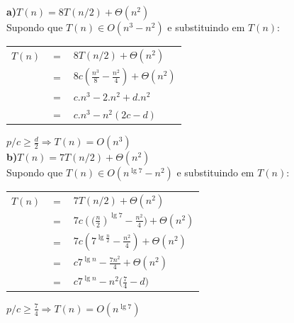 \documentclass[a4paper]{exam}
\begin{document}
\begin{questions}
  \begin{solution}
    \textbf{a)$T(n) = 8T(n/2) + \Theta(n^2)$}\\

    Supondo que $T(n) \in O(n^3 - n^2)$ e substituindo em $T(n):$\\
    \begin{tabular}{lll}
      $T(n) $& $=$ &$ 8T(n/2) + \Theta(n^2)$ \\
      {}& $=$ &$ 8c(\frac{n^3}{8} - \frac{n^2}{4}) + \Theta(n^2)$\\
      {}& $=$ &$ c.{n^3} - 2.{n^2} + d.n^2$ \\
      {}& $=$ &$ c.{n^3} - n^2({2c -d})$\\
    \end{tabular}

    $p/ c \geq \frac{d}{2} \Rightarrow T(n) = O(n^3)$\\

    \textbf{b)$T(n) = 7T(n/2) + \Theta(n^2)$}\\

    Supondo que $T(n) \in O(n^{\lg 7} - n^2)$ e substituindo em $T(n):$\\
    \begin{tabular}{lll}
      $T(n) $& $=$ &$ 7T(n/2) + \Theta(n^2)$ \\
      {}& $=$ &$ 7c({(\frac{n}{2}})^{\lg 7} - \frac{n^2}{4}) + \Theta(n^2)$\\
      {}& $=$ &$ 7c({7^{\lg \frac{n}{2}} - \frac{n^2}{4}}) + \Theta(n^2)$\\
      {}& $=$ &$ c{7^{\lg n} - \frac{7n^2}{4}} + \Theta(n^2)$\\
      {}& $=$ &$ c{7^{\lg n} - n^2(\frac{7}{4}} - d)$\\
    \end{tabular}

    $p/ c \geq \frac{7}{4} \Rightarrow T(n) = O(n^{\lg 7})$\\


\end{solution}
\end{questions}
\end{document}
